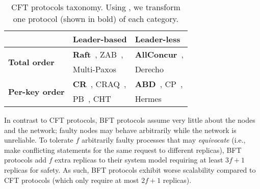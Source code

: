 



\begin{table}[t]
\small

\fontsize{7}{10}\selectfont 
\begin{center}
\begin{tabular}{ | p{2.8cm} | p{3.6cm} | p{3.6cm} | }
\rowcolor{gray!25}
 \hline
 & \bf{Leader-based} & \bf{Leader-less} \\ \hline
     \multirow{2}{*}{\bf{Total order}}  & {\bf{Raft}}~\cite{raft}, ZAB~\cite{Reed2008AST},            & {\bf{AllConcur}}~\cite{Poke2016AllConcurLC}, \\ 
 & Multi-Paxos~\cite{10.1145/2673577} & Derecho~\cite{derecho}                         \\ \hline
 
    \multirow{2}{*}{\bf{Per-key order}}  & {\bf{CR}}~\cite{chain-replication}, CRAQ~\cite{10.5555/1855807.1855818},& {\bf{ABD}}~\cite{lynch:1997}, CP~\cite{10.1145/279227.279229},  \\ 
      & PB~\cite{primary-backup}, CHT~\cite{cht}  &  Hermes~\cite{Hermes:2020} \\
\hline
\end{tabular}
\end{center}
\caption{CFT protocols taxonomy. Using \projecttitle{}, we transform one protocol (shown in bold) of each category.} \label{tab:categories}
\vspace{-2pt}
\end{table}

In contrast to CFT protocols, BFT protocols assume very little about the nodes and the network; faulty nodes may behave arbitrarily while the network is unreliable. To tolerate $f$ arbitrarily faulty processes that may \emph{equivocate} (i.e., make conflicting statements for the same request to different replicas), BFT protocols add $f$ extra replicas to their system model requiring at least $3f+1$ replicas for safety. As such, BFT protocols exhibit worse scalability compared to CFT protocols (which only require at most $2f+1$ replicas).

